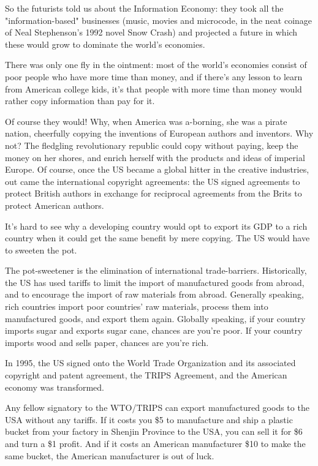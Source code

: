So the futurists told us about the Information Economy: they took
all the "information-based" businesses (music, movies and
microcode, in the neat coinage of Neal Stephenson's 1992 novel Snow
Crash) and projected a future in which these would grow to dominate
the world's economies.

There was only one fly in the ointment: most of the world's
economies consist of poor people who have more time than money, and
if there's any lesson to learn from American college kids, it's
that people with more time than money would rather copy information
than pay for it.

Of course they would! Why, when America was a-borning, she was a
pirate nation, cheerfully copying the inventions of European
authors and inventors. Why not? The fledgling revolutionary
republic could copy without paying, keep the money on her shores,
and enrich herself with the products and ideas of imperial Europe.
Of course, once the US became a global hitter in the creative
industries, out came the international copyright agreements: the US
signed agreements to protect British authors in exchange for
reciprocal agreements from the Brits to protect American authors.

It's hard to see why a developing country would opt to export its
GDP to a rich country when it could get the same benefit by mere
copying. The US would have to sweeten the pot.

The pot-sweetener is the elimination of international
trade-barriers. Historically, the US has used tariffs to limit the
import of manufactured goods from abroad, and to encourage the
import of raw materials from abroad. Generally speaking, rich
countries import poor countries' raw materials, process them into
manufactured goods, and export them again. Globally speaking, if
your country imports sugar and exports sugar cane, chances are
you're poor. If your country imports wood and sells paper, chances
are you're rich.

In 1995, the US signed onto the World Trade Organization and its
associated copyright and patent agreement, the TRIPS Agreement, and
the American economy was transformed.

Any fellow signatory to the WTO/TRIPS can export manufactured goods
to the USA without any tariffs. If it costs you \$5 to manufacture
and ship a plastic bucket from your factory in Shenjin Province to
the USA, you can sell it for \$6 and turn a \$1 profit. And if it
costs an American manufacturer \$10 to make the same bucket, the
American manufacturer is out of luck.

